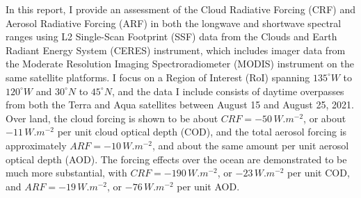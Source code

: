 \documentclass[12pt]{article}
\begin{document}
In this report, I provide an assessment of the Cloud Radiative Forcing (CRF) and Aerosol Radiative Forcing (ARF) in both the longwave and shortwave spectral ranges using L2 Single-Scan Footprint (SSF) data from the Clouds and Earth Radiant Energy System (CERES) instrument, which includes imager data from the Moderate Resolution Imaging Spectroradiometer (MODIS) instrument on the same satellite platforms. I focus on a Region of Interest (RoI) spanning $135^\circ W$ to $120^\circ W$ and $30^\circ N$ to $45^\circ N$, and the data I include consists of daytime overpasses from both the Terra and Aqua satellites between August 15 and August 25, 2021. Over land, the cloud forcing is shown to be about $CRF=-50\,\si{W.m^{-2}}$, or about $-11\,\si{W.m^{-2}}$ per unit cloud optical depth (COD), and the total aerosol forcing is approximately $ARF=-10\,\si{W.m^{-2}}$, and about the same amount per unit aerosol optical depth (AOD). The forcing effects over the ocean are demonstrated to be much more substantial, with $CRF=-190\,\si{W.m^{-2}}$, or $-23\,\si{W.m^{-2}}$ per unit COD, and $ARF=-19\,\si{W.m^{-2}}$, or $-76\,\si{W.m^{-2}}$ per unit AOD.


\end{document}
